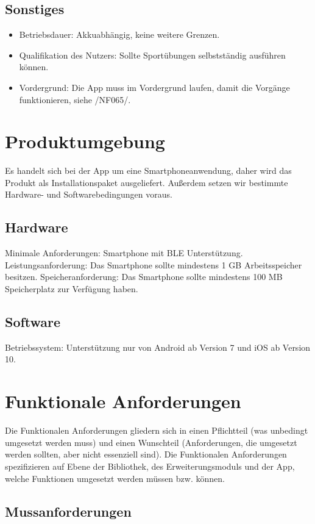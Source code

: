 \documentclass[a4paper,12pt]{article}
\begin{document}
    \subsection{Sonstiges}
    \begin{itemize}
      \item \textsf{Betriebsdauer:} \glqq Akkuabhängig\grqq, keine weitere Grenzen.
      \item \textsf{Qualifikation des Nutzers:} Sollte Sportübungen selbstständig ausführen können.
      \item \textsf{Vordergrund:} Die App muss im Vordergrund laufen, damit die Vorgänge funktionieren, siehe /NF065/.
    \end{itemize}
\clearpage
\section{Produktumgebung}
Es handelt sich bei der App um eine Smartphoneanwendung, daher wird das Produkt als Installationspaket ausgeliefert. Außerdem setzen wir bestimmte Hardware- und Softwarebedingungen voraus.
\subsection{Hardware} 
	\textsf{Minimale Anforderungen:} Smartphone mit \Gls{BLE} Unterstützung. %
	\textsf{Leistungsanforderung:} Das Smartphone sollte mindestens 1 GB Arbeitsspeicher besitzen.
	\textsf{Speicheranforderung:} Das Smartphone sollte mindestens 100 MB Speicherplatz zur Verfügung haben.
\subsection{Software} 
	\textsf{Betriebssystem:} Unterstützung nur von Android ab Version 7 und iOS ab Version 10.
\newline
\newline
\newline
\section{Funktionale Anforderungen}
Die Funktionalen Anforderungen gliedern sich in einen Pflichtteil (was unbedingt umgesetzt werden muss) und einen Wunschteil (Anforderungen, die umgesetzt werden sollten, aber nicht essenziell sind). Die Funktionalen Anforderungen spezifizieren auf Ebene der Bibliothek, des Erweiterungsmoduls und der App, welche Funktionen umgesetzt werden müssen bzw. können. 
  \subsection{Mussanforderungen}
\end{document}

